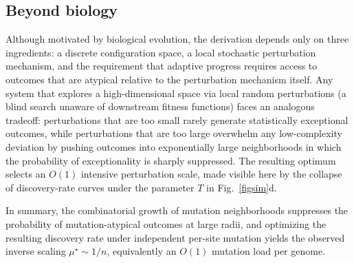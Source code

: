 \documentclass[9pt,twocolumn,oneside]{pnas-new}
\begin{document}
\subsection*{Beyond biology}
Although motivated by biological evolution, the derivation depends only on three ingredients: a discrete configuration space, a local stochastic perturbation mechanism, and the requirement that adaptive progress requires access to outcomes that are atypical relative to the perturbation mechanism itself. Any system that explores a high-dimensional space via local random perturbations (a blind search unaware of downstream fitness functions) faces an analogous tradeoff: perturbations that are too small rarely generate statistically exceptional outcomes, while perturbations that are too large overwhelm any low-complexity deviation by pushing outcomes into exponentially large neighborhoods in which the probability of exceptionality is sharply suppressed. The resulting optimum selects an $O(1)$ intensive perturbation scale, made visible here by the collapse of discovery-rate curves under the parameter $T$ in Fig.~\ref{figsim}d.




In summary, the combinatorial growth of mutation neighborhoods suppresses the probability of mutation-atypical outcomes at large radii, and optimizing the resulting discovery rate under independent per-site mutation yields the observed inverse scaling $\mu^\star \sim 1/n$, equivalently an $O(1)$ mutation load per genome.
\end{document}
